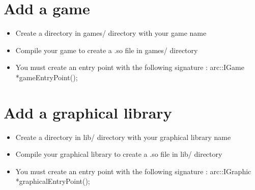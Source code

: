 \documentclass[12pt]{article}
\begin{document}
\section{Add a game}
\begin{itemize}
\item Create a directory in games/ directory with your game name
\item Compile your game to create a .so file in games/ directory
\item You must create an entry point with the following signature : \newline arc::IGame *gameEntryPoint();
\end{itemize}

\section{Add a graphical library}
\begin{itemize}
\item Create a directory in lib/ directory with your graphical library name
\item Compile your graphical library to create a .so file in lib/ directory
\item You must create an entry point with the following signature : \newline arc::IGraphic *graphicalEntryPoint();
\end{itemize}
\end{document}
